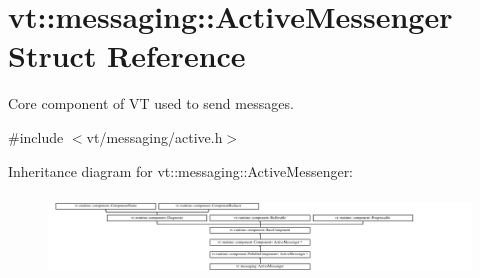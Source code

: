 \hypertarget{structvt_1_1messaging_1_1_active_messenger}{}\section{vt\+:\+:messaging\+:\+:Active\+Messenger Struct Reference}
\label{structvt_1_1messaging_1_1_active_messenger}


Core component of VT used to send messages.  




{\ttfamily \#include $<$vt/messaging/active.\+h$>$}

Inheritance diagram for vt\+:\+:messaging\+:\+:Active\+Messenger\+:\begin{figure}[H]
\begin{center}
\leavevmode
\includegraphics[height=2.204725cm]{structvt_1_1messaging_1_1_active_messenger}
\end{center}
\end{figure}
